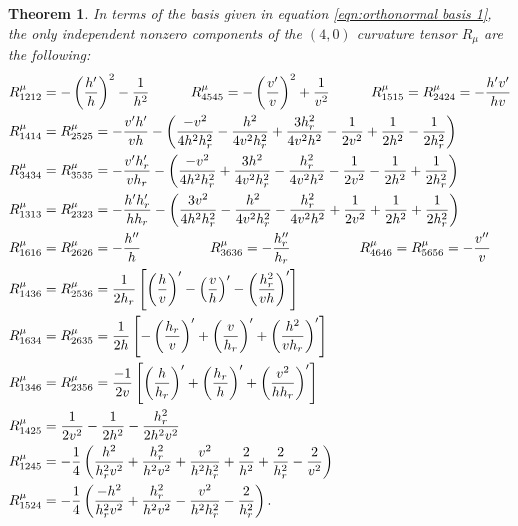 \documentclass[10pt]{amsart}
\newtheorem{theorem}{Theorem}[section]
\theoremstyle{definition}
\theoremstyle{remark}
\numberwithin{equation}{section}
\begin{document}
\begin{theorem}\label{thm:curvature tensor 1}
In terms of the basis given in equation \eqref{eqn:orthonormal basis 1}, the only independent nonzero components of the $(4,0)$ curvature tensor $R_{\mu}$ are the following:
	\begin{align*}
	&R^{\mu}_{1212} = - \left( \frac{h'}{h} \right)^2 - \frac{1}{h^2}  \hskip  30pt  R^{\mu}_{4545} = - \left( \frac{v'}{v} \right)^2 + \frac{1}{v^2}  \hskip 30pt  R^{\mu}_{1515} = R^{\mu}_{2424} = - \frac{h' v'}{hv}  \\
	&R^{\mu}_{1414} = R^{\mu}_{2525} = - \frac{v'h'}{v h} - \left( \frac{-v^2}{4h^2h_r^2} - \frac{h^2}{4v^2h_r^2} + \frac{3h_r^2}{4v^2h^2} - \frac{1}{2v^2} + \frac{1}{2h^2} - \frac{1}{2h_r^2} \right)  \\
	&R^{\mu}_{3434} = R^{\mu}_{3535} = - \frac{v'h_r'}{vh_r} - \left( \frac{- v^2}{4h^2h_r^2} + \frac{3h^2}{4v^2h_r^2} - \frac{h_r^2}{4v^2h^2} - \frac{1}{2v^2} - \frac{1}{2h^2} + \frac{1}{2h_r^2}  \right) \\
	&R^{\mu}_{1313} = R^{\mu}_{2323} = - \frac{h' h_r'}{h h_r} - \left( \frac{3v^2}{4h^2 h_r^2} - \frac{h^2}{4v^2h_r^2} - \frac{h_r^2}{4v^2h^2} + \frac{1}{2v^2} + \frac{1}{2h^2} + \frac{1}{2h_r^2} \right)  \\
	&R^{\mu}_{1616} = R^{\mu}_{2626} = - \frac{h''}{h} \hskip 50pt R^{\mu}_{3636} = - \frac{h_r''}{h_r}  \hskip 50pt  R^{\mu}_{4646} = R^{\mu}_{5656} = - \frac{v''}{v}  \\
	&R^{\mu}_{1436} = R^{\mu}_{2536} = \frac{1}{2h_r} \left[ \left( \frac{h}{v} \right)' - \left( \frac{v}{h} \right)' - \left( \frac{h_r^2}{vh} \right)' \right]  \\
	&R^{\mu}_{1634} = R^{\mu}_{2635} = \frac{1}{2h} \left[ - \left( \frac{h_r}{v} \right)' + \left( \frac{v}{h_r} \right)' + \left( \frac{h^2}{vh_r} \right)' \right] \\
	&R^{\mu}_{1346} = R^{\mu}_{2356} = \frac{-1}{2v} \left[ \left( \frac{h}{h_r} \right)' + \left( \frac{h_r}{h} \right)' + \left( \frac{v^2}{h h_r} \right)' \right] \\
	&R^{\mu}_{1425} =  \frac{1}{2v^2} - \frac{1}{2h^2} - \frac{h_r^2}{2 h^2 v^2}  \\
	&R^{\mu}_{1245} =  - \frac{1}{4} \left( \frac{h^2}{h_r^2 v^2} + \frac{h_r^2}{h^2 v^2} + \frac{v^2}{h^2 h_r^2} + \frac{2}{h^2} + \frac{2}{h_r^2} - \frac{2}{v^2} \right)  \\
	&R^{\mu}_{1524} =  - \frac{1}{4} \left( \frac{-h^2}{h_r^2 v^2} + \frac{h_r^2}{h^2 v^2} - \frac{v^2}{h^2 h_r^2} - \frac{2}{h_r^2} \right).
	\end{align*}
\end{theorem}
	
\end{document}
